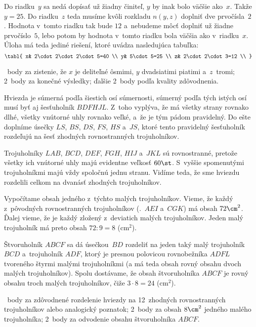 {Do riadku~$y$ sa nedá dopísať už žiadny činiteľ, $y$ by inak bolo väčšie ako~$x$.
Takže $y=25$.
Do riadku~$z$ teda musíme kvôli rozkladu $n(y,z)$ doplniť dve prvočísla~$2$.
Hodnota v~tomto riadku tak bude $12$ a~nebudeme môcť doplniť už žiadne prvočíslo~$5$,
lebo potom by hodnota v~tomto riadku bola väčšia ako v~riadku~$x$.
Úloha má teda jediné riešení, ktoré uvádza nasledujúca tabuľka:
$$
\tabl{
x& 2\cdot2\cdot2\cdot5=40 \\
y& 5\cdot5=25 \\
z& 2\cdot2\cdot3=12 \\
}
$$

~body za zistenie, že $x$ je deliteľné ôsmimi, $y$ dvadsiatimi piatimi a~$z$~tromi;
2~body za konečné výsledky;
ďalšie 2~body podľa kvality zdôvodnenia.
\endhodnotenie
}

{%
Hviezda je súmerná podľa šiestich osí súmernosti, súmerný podľa tých istých
osí musí byť aj šesťuholník $BDFHJL$.
Z~toho vyplýva, že má všetky strany rovnako dlhé, všetky vnútorné uhly
rovnako veľké, a~že je tým pádom pravidelný.
Do \obr{} ešte doplníme úsečky $LS$, $BS$, $DS$, $FS$, $HS$ a~$JS$, ktoré
tento pravidelný šesťuholník rozdeľujú na šesť zhodných rovnostranných
trojuholníkov.
%

Trojuholníky $LAB$, $BCD$, $DEF$, $FGH$, $HIJ$ a~$JKL$ sú rovnostranné,
pretože všetky ich vnútorné uhly majú evidentne veľkosť $60\st$.
S~vyššie spomenutými trojuholníkmi majú vždy spoločnú jednu stranu.
Vidíme teda, že sme hviezdu rozdelili celkom na dvanásť zhodných trojuholníkov.

Vypočítame obsah jedného z~týchto malých trojuholníkov.
Vieme, že každý z~pôvodných rovnostranných trojuholníkov (\tj.~$AEI$ a~$CGK$)
má obsah $72\cm^2$.
Ďalej vieme, že je každý zložený z~deviatich malých trojuholníkov.
Jeden malý trojuholník má preto obsah $72:9=8$ ($\text{cm}^2$).

Štvoruholník $ABCF$ sa dá úsečkou~$BD$ rozdeliť na jeden taký malý trojuholník $BCD$ a~trojuholník $ADF$, ktorý je presnou polovicou rovnobežníka $ADFL$ tvoreného štyrmi malými trojuholníkmi (a má teda obsah rovný obsahu dvoch malých trojuholníkov). Spolu dostávame, že obsah štvoruholníka $ABCF$ je rovný obsahu troch malých trojuholníkov, čiže $3\cdot 8=24$ ($\text{cm}^2$).


~body za zdôvodnené rozdelenie hviezdy na 12~zhodných rovnostranných
trojuholníkov alebo analogický poznatok;
2~body za obsah $8\cm^2$ jedného malého trojuholníka;
2~body za odvodenie obsahu štvoruholníka $ABCF$.
\endhodnotenie
}

